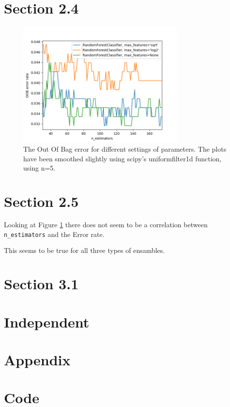 \documentclass{article}
\begin{document}
\section*{Section 2.4}
\begin{figure}[h]
    \centering
    \includegraphics[width=0.75\textwidth]{09_random_forests/2_4_1.png}
    \caption{The Out Of Bag error for different settings of parameters. The plots have been smoothed slightly using scipy's uniformfilter1d function, using n=5.}
    \label{fig:24}
\end{figure}

\section*{Section 2.5}
Looking at Figure \ref{fig:24} there does not seem to be a correlation between \verb"n_estimators" and the Error rate.

This seems to be true for all three types of ensambles.

\section{Section 3.1}

\section*{Independent}

\newpage
\section*{Appendix}
\appendix
\section{Code}


\end{document}
